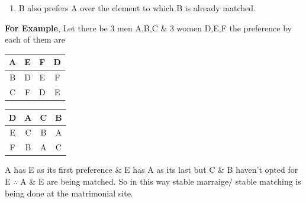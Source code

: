 \documentclass[15pt]{article}
\begin{document}
\begin{enumerate}
\begin{enumerate}
\begin{enumerate}
\item B also prefers A over the element to which B is already matched.
\end{enumerate}
\textbf{For Example}, Let there be 3 men A,B,C \& 3 women D,E,F the preference by each of them are\\
\begin{center}
\begin{tabular}{ |c|c c c| } 
 \hline
 A & E & F & D \\ [0.5ex] 
 \hline
 B & D & E & F \\ 
 \hline
 C & F & D & E \\ [1ex] 
 \hline
\end{tabular}
\begin{tabular}{ |c|c c c| } 
 \hline
 D & A & C & B \\ [0.5ex] 
 \hline
 E & C & B & A \\ 
 \hline
 F & B & A & C \\ [1ex] 
 \hline
\end{tabular}
\end{center}
A has E as its first preference \& E has A as its last but C \& B haven't opted for E $\therefore$ A \& E are being matched. So in this way stable marraige$/$ stable matching is being done at the matrimonial site.
\end{enumerate}
\end{enumerate}
\end{document}
